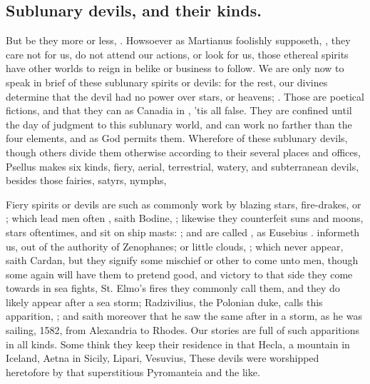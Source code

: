 \subsection{Sublunary devils, and their kinds.}

But be they more or less, . Howsoever as Martianus foolishly supposeth,
, they care not for us, do not
attend our actions, or look for us, those ethereal spirits have other worlds to
reign in belike or business to follow. We are only now to speak in brief of
these sublunary spirits or devils: for the rest, our divines determine that the
devil had no power over stars, or heavens; . Those are poetical fictions, and that they can
 as Canadia in \Horace{}, 'tis
all false. They are confined until the day of judgment to
this sublunary world, and can work no farther than the four elements, and as
God permits them. Wherefore of these sublunary devils, though others divide
them otherwise according to their several places and offices, Psellus makes six
kinds, fiery, aerial, terrestrial, watery, and subterranean devils, besides
those fairies, satyrs, nymphs, \etc{}

Fiery spirits or devils are such as commonly work by blazing stars,
fire-drakes, or ; which lead men often , saith Bodine,  ; likewise they counterfeit suns and moons,
stars oftentimes, and sit on ship masts: ; and are called , as Eusebius . informeth us, out of the authority of
Zenophanes; or little clouds, ; which never
appear, saith Cardan, but they signify some mischief or other to come unto men,
though some again will have them to pretend good, and victory to that side they
come towards in sea fights, St. Elmo's fires they commonly call them, and they
do likely appear after a sea storm; Radzivilius, the Polonian duke, calls this
apparition, ; and saith moreover that he saw the same
after in a storm, as he was sailing, 1582, from Alexandria to Rhodes.
Our stories are full of such apparitions in all kinds.
Some think they keep their residence in that Hecla, a mountain in Iceland,
Aetna in Sicily, Lipari, Vesuvius, \etc{} These devils were worshipped
heretofore by that superstitious Pyromanteia and the like.


